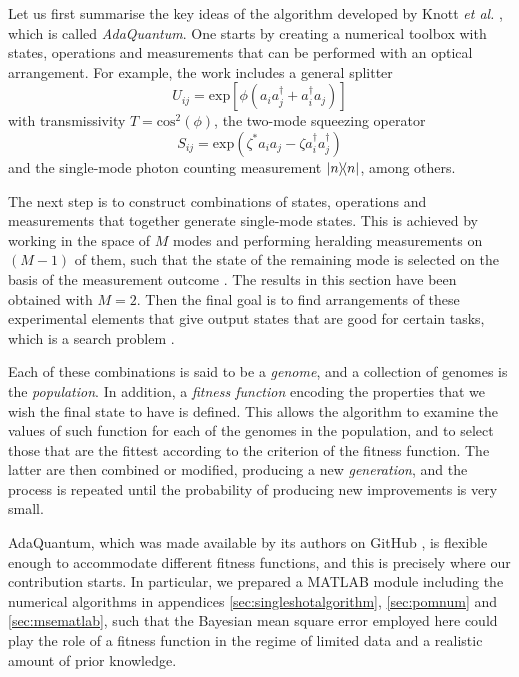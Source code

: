 Let us first summarise the key ideas of the algorithm developed by Knott \emph{et al.} \cite{jesus2018dec}, which is called \emph{AdaQuantum}. One starts by creating a numerical toolbox with states, operations and measurements that can be performed with an optical arrangement. For example, the work \cite{jesus2018dec} includes a general splitter 
\begin{equation}
U_{ij}=\mathrm{exp}\left[\phi \left( a_i a_j^\dagger + a_i^\dagger a_j \right)\right]
\end{equation}
with transmissivity $T = \mathrm{cos}^2(\phi)$, the two-mode squeezing operator
\begin{equation}
S_{ij}=\mathrm{exp}\left(\zeta^{*}a_i a_j - \zeta a_i^\dagger a_j^\dagger\right)
\end{equation}
and the single-mode photon counting measurement $\ketbra{n}$, among others. 

The next step is to construct combinations of states, operations and measurements that together generate single-mode states. This is achieved by working in the space of $M$ modes and performing heralding measurements on $(M-1)$ of them, such that the state of the remaining mode is selected on the basis of the measurement outcome \cite{knott2016}. The results in this section have been obtained with $M = 2$. Then the final goal is to find arrangements of these experimental elements that give output states that are good for certain tasks, which is a search problem \cite{jesus2018dec}. 

Each of these combinations is said to be a \emph{genome}, and a collection of genomes is the \emph{population}. In addition, a \emph{fitness function} encoding the properties that we wish the final state to have is defined. This allows the algorithm to examine the values of such function for each of the genomes in the population, and to select those that are the fittest according to the criterion of the fitness function. The latter are then combined or modified, producing a new \emph{generation}, and the process is repeated until the probability of producing new improvements is very small.  

AdaQuantum, which was made available by its authors on GitHub \cite{adaquantum2019}, is flexible enough to accommodate different fitness functions, and this is precisely where our contribution starts. In particular, we prepared a MATLAB module including the numerical algorithms in appendices \ref{sec:singleshotalgorithm}, \ref{sec:pomnum} and \ref{sec:msematlab}, such that the Bayesian mean square error employed here could play the role of a fitness function in the regime of limited data and a realistic amount of prior knowledge. 

